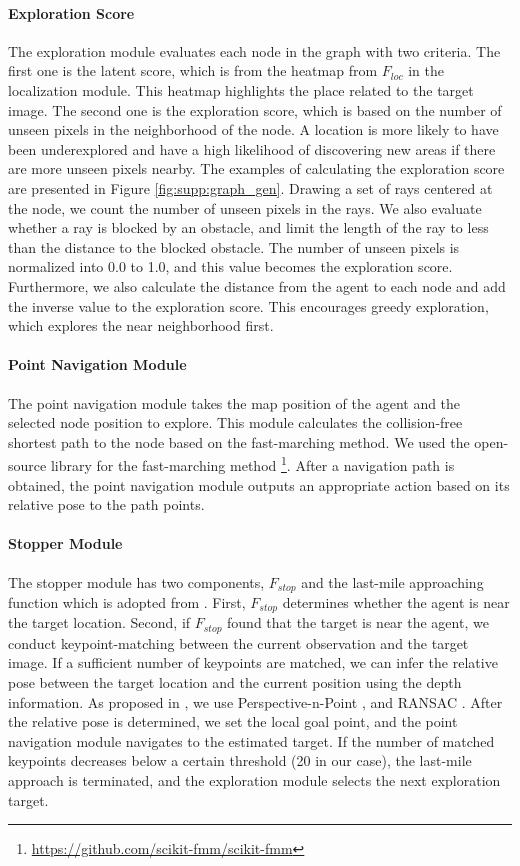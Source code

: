 \documentclass[10pt,twocolumn,letterpaper]{article}
\begin{document}
\paragraph{Exploration Score}\label{appendix:impd_navi:exp}
The exploration module evaluates each node in the graph with two criteria.
%
The first one is the latent score, which is from the heatmap from $F_{loc}$ in the localization module.
%
This heatmap highlights the place related to the target image.
%
The second one is the exploration score, which is based on the number of unseen pixels in the neighborhood of the node.
%
A location is more likely to have been underexplored and have a high likelihood of discovering new areas if there are more unseen pixels nearby.
%
The examples of calculating the exploration score are presented in Figure \ref{fig:supp:graph_gen}.
%
Drawing a set of rays centered at the node, we count the number of unseen pixels in the rays.
%
We also evaluate whether a ray is blocked by an obstacle, and limit the length of the ray to less than the distance to the blocked obstacle.
%
The number of unseen pixels is normalized into 0.0 to 1.0, and this value becomes the exploration score.
%
Furthermore, we also calculate the distance from the agent to each node and add the inverse value to the exploration score.
%
This encourages greedy exploration, which explores the near neighborhood first.

\paragraph{Point Navigation Module}\label{appendix:impd_navi:point_navi}
The point navigation module takes the map position of the agent and the selected node position to explore. 
%
This module calculates the collision-free shortest path to the node based on the fast-marching method.
%
We used the open-source library for the fast-marching method \footnote{\url{https://github.com/scikit-fmm/scikit-fmm}}.
%
After a navigation path is obtained, the point navigation module outputs an appropriate action based on its relative pose to the path points.

\paragraph{Stopper Module}\label{appendix:impd_navi:stopper}
The stopper module has two components, $F_{stop}$ and the last-mile approaching function which is adopted from \cite{SLING}.
%
First, $F_{stop}$ determines whether the agent is near the target location.
%
Second, if $F_{stop}$ found that the target is near the agent, we conduct keypoint-matching \cite{superglue} between the current observation and the target image.
%
If a sufficient number of keypoints are matched, we can infer the relative pose between the target location and the current position using the depth information.
%
As proposed in \cite{SLING}, we use Perspective-n-Point \cite{epnp}, and RANSAC \cite{ransac}.
%
After the relative pose is determined, we set the local goal point, and the point navigation module navigates to the estimated target.
%
If the number of matched keypoints decreases below a certain threshold (20 in our case), the last-mile approach is terminated, and the exploration module selects the next exploration target.
%
\end{document}
